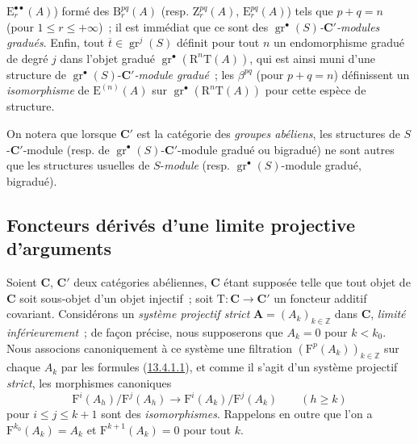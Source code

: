 \begin{env}[13.6.6]
$\mathrm E_r^{\bullet\bullet}(A)$) formé des $\mathrm B_r^{pq}(A)$ (resp.
$\mathrm Z_r^{pq}(A)$, $\mathrm E_r^{pq}(A)$) tels que $p+q=n$ (pour
$1\leq r\leq+\infty$)~; il est immédiat que ce sont des
\emph{$\operatorname{gr}^\bullet(S)$-$\boldsymbol{C}'$-modules gradués}. Enfin, tout
$\overline t\in\operatorname{gr}^j(S)$ définit pour tout $n$ un
endomorphisme gradué de degré $j$ dans l'objet gradué
$\operatorname{gr}^\bullet(\mathrm R^n\mathrm T(A))$, qui est ainsi muni
d'une structure de
$\operatorname{gr}^\bullet(S)$-\emph{$\boldsymbol{C}'$-module gradué}~; les
$\beta^{pq}$ (pour $p+q=n$) définissent un \emph{isomorphisme} de
$\mathrm E^{(n)}(A)$ sur
$\operatorname{gr}^\bullet(\mathrm R^n\mathrm T(A))$ pour cette espèce
de structure.

On notera que lorsque $\boldsymbol{C}'$ est la catégorie des \emph{groupes abéliens}, les
structures de $S$-$\boldsymbol{C}'$-module (resp. de
$\operatorname{gr}^\bullet(S)$-$\boldsymbol{C}'$-module gradué ou bigradué) ne sont
autres que les structures usuelles de $S$-\emph{module} (resp.
$\operatorname{gr}^\bullet(S)$-module gradué, bigradué).
\end{env}

\subsection{Foncteurs dérivés d'une limite projective d'arguments}
\label{subsection:0.13.7-fr}

\begin{env}[13.7.1]
\label{0.13.7.1-fr}
Soient $\boldsymbol{C}$, $\boldsymbol{C}'$ deux catégories abéliennes, $\boldsymbol{C}$ étant supposée telle
que tout objet de $\boldsymbol{C}$ soit sous-objet d'un objet injectif~; soit
$\mathrm T:\boldsymbol{C}\to \boldsymbol{C}'$ un foncteur additif covariant. Considérons un
\emph{système projectif strict} $\mathbf A=(A_k)_{k\in\mathbb Z}$ dans $\boldsymbol{C}$,
\emph{limité inférieurement}~; de façon précise, nous supposerons que
$A_k=0$ pour $k<k_0$. Nous associons canoniquement à ce système une
filtration $(\mathrm F^p(A_k))_{k\in\mathbb Z}$ sur chaque $A_k$ par les
formules (\hyperref[0.13.4.1.1-fr]{13.4.1.1}), et comme il s'agit d'un
système projectif \emph{strict}, les morphismes canoniques
\begin{equation}
\label{0.13.7.1.1-fr}
\tag{13.7.1.1}
\mathrm F^i(A_h)/\mathrm F^j(A_h)\to
\mathrm F^i(A_k)/\mathrm F^j(A_k)\qquad(h\geq k)
\end{equation}
pour $i\leq j\leq k+1$ sont des \emph{isomorphismes}. Rappelons en outre que
l'on a $\mathrm F^{k_0}(A_k)=A_k$ et $\mathrm F^{k+1}(A_k)=0$ pour tout
$k$.
\end{env}

